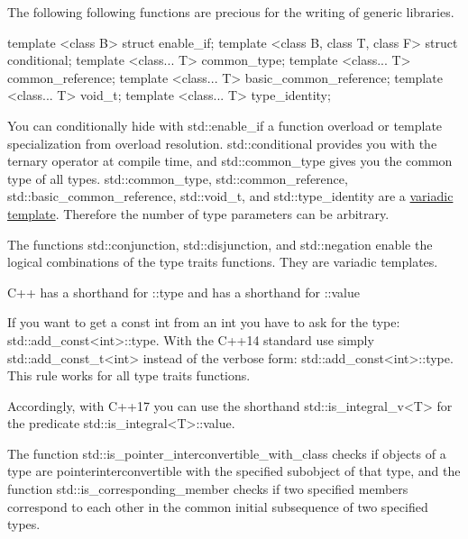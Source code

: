 The following following functions are precious for the writing of generic libraries.

\begin{cpp}
template <class B> struct enable_if;
template <class B, class T, class F> struct conditional;
template <class... T> common_type;
template <class... T> common_reference;
template <class... T> basic_common_reference;
template <class... T> void_t;
template <class... T> type_identity;
\end{cpp}

You can conditionally hide with std::enable\_if a function overload or template specialization from overload resolution. std::conditional provides you with the ternary operator at compile time, and std::common\_type gives you the common type of all types. std::common\_type, std::common\_reference, std::basic\_common\_reference, std::void\_t, and std::type\_identity are a \href{http://en.cppreference.com/w/cpp/language/parameter_pack}{variadic template}. Therefore the number of type parameters can be arbitrary.


The functions std::conjunction, std::disjunction, and std::negation enable the logical combinations of the type traits functions. They are variadic templates.

\begin{myTip}{C++ has a shorthand for ::type and has a shorthand for ::value}
	
If you want to get a const int from an int you have to ask for the type: std::add\_const<int>::type. With the C++14 standard use simply std::add\_const\_t<int> instead of the verbose form: std::add\_const<int>::type. This rule works for all type traits functions.

Accordingly, with C++17 you can use the shorthand std::is\_integral\_v<T> for the predicate std::is\_integral<T>::value.
	
\end{myTip}


The function std::is\_pointer\_interconvertible\_with\_class checks if objects of a type are pointerinterconvertible with the specified subobject of that type, and the function std::is\_corresponding\_member checks if two specified members correspond to each other in the common initial subsequence of two specified types.



